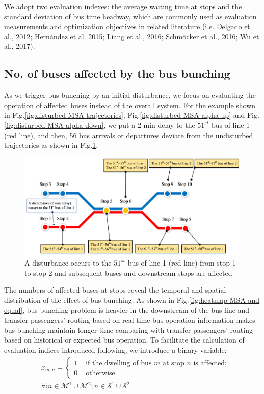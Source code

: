 \documentclass[smallextended]{svjour3}       %
\begin{document}
\begin{Abstract}
We adopt two evaluation indexes: 
the average waiting time at stops and the standard deviation of bus time headway, which are commonly used 
as evaluation measurements and optimization objectives in related literature (i.e. Delgado et al., 2012; Hernández et al. 2015; Liang et al., 2016; Schmöcker et al., 2016; Wu et al., 2017).


\subsection{No. of buses affected by the bus bunching}
As we trigger bus bunching by an initial disturbance, 
we focus on evaluating the operation of affected buses instead of the overall system.
For the example shown in Fig.\ref{fig:disturbed MSA trajectories}, Fig.\ref{fig:disturbed MSA alpha up} and Fig.\ref{fig:disturbed MSA alpha down}, 
we put a 2 min delay to the $51^{st}$ bus of line 1 (red line), 
and then, 56 bus arrivals or departures deviate from the undisturbed trajectories
as shown in Fig.\ref{fig:range}. 
\begin{figure}[H]
    \centering
    \includegraphics[width=0.9\linewidth]{CASPT2021paper_fig/range.png}
    \caption{A disturbance occurs to the $51^{st}$ bus of line 1 (red line) from stop 1 to stop 2 and subsequent buses and downstream stops are affected}
    \label{fig:range}
\end{figure}
The numbers of affected buses at stops reveal the temporal and spatial distribution of the effect of bus bunching.
As shown in Fig.\ref{fig:heatmap MSA and equal}, bus bunching problem is heavier in the downstream of the bus line and transfer passengers' routing based on real-time bus operation information makes bus bunching maintain longer time comparing with 
transfer passengers' routing based on historical or expected bus operation.
To facilitate the calculation of evaluation indices introduced following, 
we introduce a binary variable: 
\begin{equation}
    \begin{split}
        &x_{m,n}=
        \begin{cases}
            1&\text{ if the dwelling of bus } m \text{ at stop } n \text{ is affected;}\\
            0&\text{ otherwise.}
        \end{cases}\\
        &\forall m \in \mathcal{M}^{1}\cup\mathcal{M}^{2}; n \in \mathcal{S}^{1}\cup\mathcal{S}^{2}        
    \end{split}
\end{equation}

\end{Abstract}
\end{document}
